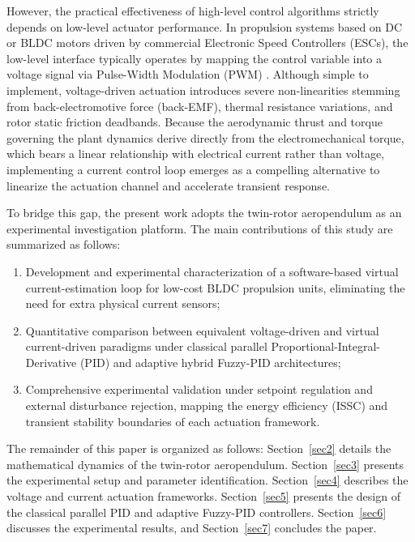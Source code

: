 \documentclass[pdflatex,sn-mathphys-num,iicol]{sn-jnl}
\theoremstyle{thmstyleone}%
\theoremstyle{thmstyletwo}%
\theoremstyle{thmstylethree}%
\begin{document}
However, the practical effectiveness of high-level control algorithms strictly depends on low-level actuator performance. In propulsion systems based on DC or BLDC motors driven by commercial Electronic Speed Controllers (ESCs), the low-level interface typically operates by mapping the control variable into a voltage signal via Pulse-Width Modulation (PWM) \citep{tanveer2023robust, rojas2024hunting}. Although simple to implement, voltage-driven actuation introduces severe non-linearities stemming from back-electromotive force (back-EMF), thermal resistance variations, and rotor static friction deadbands. Because the aerodynamic thrust and torque governing the plant dynamics derive directly from the electromechanical torque, which bears a linear relationship with electrical current rather than voltage, implementing a current control loop emerges as a compelling alternative to linearize the actuation channel and accelerate transient response.

To bridge this gap, the present work adopts the twin-rotor aeropendulum as an experimental investigation platform. The main contributions of this study are summarized as follows:

\begin{enumerate}
    \item Development and experimental characterization of a software-based virtual current-estimation loop for low-cost BLDC propulsion units, eliminating the need for extra physical current sensors;
    \item Quantitative comparison between equivalent voltage-driven and virtual current-driven paradigms under classical parallel Proportional-Integral-Derivative (PID) and adaptive hybrid Fuzzy-PID architectures;
    \item Comprehensive experimental validation under setpoint regulation and external disturbance rejection, mapping the energy efficiency (ISSC) and transient stability boundaries of each actuation framework.
\end{enumerate}

The remainder of this paper is organized as follows: Section~\ref{sec2} details the mathematical dynamics of the twin-rotor aeropendulum. Section~\ref{sec3} presents the experimental setup and parameter identification. Section~\ref{sec4} describes the voltage and current actuation frameworks. Section~\ref{sec5} presents the design of the classical parallel PID and adaptive Fuzzy-PID controllers. Section~\ref{sec6} discusses the experimental results, and Section~\ref{sec7} concludes the paper.
\end{document}
